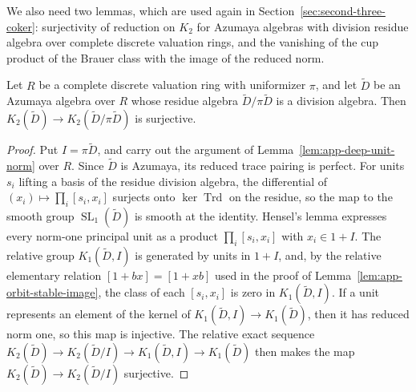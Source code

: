 We also need two lemmas, which are used again in Section~\ref{sec:second-three-coker}: surjectivity of reduction on $K_2$ for Azumaya algebras with division residue algebra over complete discrete valuation rings, and the vanishing of the cup product of the Brauer class with the image of the reduced norm.

\begin{lemma}\label{lem:second-three-azumaya-reduction}
Let $R$ be a complete discrete valuation ring with uniformizer $\pi$, and let $\widetilde D$ be an Azumaya algebra over $R$ whose residue algebra $\widetilde D/\pi\widetilde D$ is a division algebra.
Then $K_2(\widetilde D)\to K_2(\widetilde D/\pi\widetilde D)$ is surjective.
\end{lemma}
\begin{proof}
Put $I=\pi\widetilde D$, and carry out the argument of Lemma~\ref{lem:app-deep-unit-norm} over $R$.
Since $\widetilde D$ is Azumaya, its reduced trace pairing is perfect.
For units $s_i$ lifting a basis of the residue division algebra, the differential of $(x_i)\mapsto\prod_i[s_i,x_i]$ surjects onto $\ker\operatorname{Trd}$ on the residue, so the map to the smooth group $\operatorname{SL}_1(\widetilde D)$ is smooth at the identity.
Hensel's lemma expresses every norm-one principal unit as a product $\prod_i[s_i,x_i]$ with $x_i\in1+I$.
The relative group $K_1(\widetilde D,I)$ is generated by units in $1+I$, and, by the relative elementary relation $[1+bx]=[1+xb]$ used in the proof of Lemma~\ref{lem:app-orbit-stable-image}, the class of each $[s_i,x_i]$ is zero in $K_1(\widetilde D,I)$.
If a unit represents an element of the kernel of $K_1(\widetilde D,I)\to K_1(\widetilde D)$, then it has reduced norm one, so this map is injective.
The relative exact sequence $K_2(\widetilde D)\to K_2(\widetilde D/I)\to K_1(\widetilde D,I)\to K_1(\widetilde D)$ then makes the map $K_2(\widetilde D)\to K_2(\widetilde D/I)$ surjective.
\end{proof}

